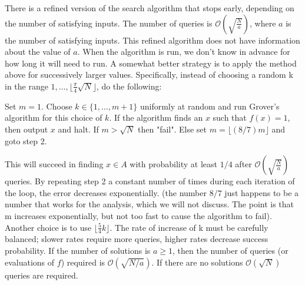 There is a refined version of the search algorithm that stops early, depending on the number of satisfying inputs. The number of queries is $\mathcal{O}(\sqrt{\frac{N}{a}})$, where $a$ is the number of satisfying inputs. This refined algorithm does not have information about the value of $a$. When the algorithm is run, we don't know in advance for how long it will need to run. A somewhat better strategy is to apply the method above for successively larger values. Specifically, instead of choosing a random k in the range $1,\ldots, \lfloor \frac{\pi}{4}\sqrt{N}\rfloor$, do the following:

\begin{algorithm}
    \caption{Modified Grover's Algorithm for $a \geq 1$}
    \begin{algorithmic}[1]
    \State Set $m=1$.
    \State Choose $ k \in \{1,\ldots, m+1\}$ uniformly at random and run Grover's algorithm for this choice of $k$. If the algorithm finds an $x$ such that $f(x)=1$, then output $x$ and halt.
    \State If $m>\sqrt{N}$ then "fail". Else set $m=\lfloor (8/7)m\rfloor$ and goto step 2.
    \end{algorithmic}
\end{algorithm}
This will succeed in finding $x \in A$ with probability at least $1/4$ after $\mathcal{O}(\sqrt{\frac{N}{a}})$ queries. By repeating step 2 a constant number of times during each iteration of the loop, the error decreases exponentially. (the number $8/7$ just happens to be a number that works for the analysis, which we will not discuss. The point is that m increases exponentially, but not too fast to cause the algorithm to fail). Another choice is to use $\lfloor \frac{5}{4}k\rfloor$. The rate of increase of k must be carefully balanced; slower rates require more queries, higher rates decrease success probability. If the number of solutions is $a\geq 1$, then the number of queries (or evaluations of $f$) required is $\mathcal{O}(\sqrt{N/a})$. If there are no solutions $\mathcal{O}(\sqrt{N})$ queries are required.

